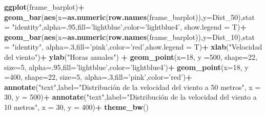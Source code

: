 \documentclass[]{article}
\newenvironment{Shaded}{\begin{snugshade}}{\end{snugshade}}
\newcommand{\KeywordTok}[1]{\textcolor[rgb]{0.13,0.29,0.53}{\textbf{#1}}}
\newcommand{\DataTypeTok}[1]{\textcolor[rgb]{0.13,0.29,0.53}{#1}}
\newcommand{\DecValTok}[1]{\textcolor[rgb]{0.00,0.00,0.81}{#1}}
\newcommand{\StringTok}[1]{\textcolor[rgb]{0.31,0.60,0.02}{#1}}
\newcommand{\OperatorTok}[1]{\textcolor[rgb]{0.81,0.36,0.00}{\textbf{#1}}}
\newcommand{\NormalTok}[1]{#1}
\begin{document}
\begin{Shaded}
\begin{Highlighting}[]
{{{\KeywordTok{ggplot}\NormalTok{(frame_barplot)}\OperatorTok{+}
\StringTok{  }\KeywordTok{geom_bar}\NormalTok{(}\KeywordTok{aes}\NormalTok{(}\DataTypeTok{x=}\KeywordTok{as.numeric}\NormalTok{(}\KeywordTok{row.names}\NormalTok{(frame_barplot)),}\DataTypeTok{y=}\NormalTok{Dist_}\DecValTok{50}\NormalTok{),}\DataTypeTok{stat =} \StringTok{"identity"}\NormalTok{,}\DataTypeTok{alpha=}\NormalTok{.}\DecValTok{95}\NormalTok{,}\DataTypeTok{fill=}\StringTok{'lightblue'}\NormalTok{,}\DataTypeTok{color=}\StringTok{'lightblue4'}\NormalTok{, }\DataTypeTok{show.legend =}\NormalTok{ T)}\OperatorTok{+}
\StringTok{  }\KeywordTok{geom_bar}\NormalTok{(}\KeywordTok{aes}\NormalTok{(}\DataTypeTok{x=}\KeywordTok{as.numeric}\NormalTok{(}\KeywordTok{row.names}\NormalTok{(frame_barplot)),}\DataTypeTok{y=}\NormalTok{Dist_}\DecValTok{10}\NormalTok{),}\DataTypeTok{stat =} \StringTok{"identity"}\NormalTok{, }\DataTypeTok{alpha=}\NormalTok{.}\DecValTok{3}\NormalTok{,}\DataTypeTok{fill=}\StringTok{'pink'}\NormalTok{,}\DataTypeTok{color=}\StringTok{'red'}\NormalTok{,}\DataTypeTok{show.legend =}\NormalTok{ T)}\OperatorTok{+}
\KeywordTok{xlab}\NormalTok{(}\StringTok{"Velocidad del viento"}\NormalTok{)}\OperatorTok{+}
\KeywordTok{ylab}\NormalTok{(}\StringTok{"Horas anuales"}\NormalTok{) }\OperatorTok{+}
\StringTok{ }\KeywordTok{geom_point}\NormalTok{(}\DataTypeTok{x=}\DecValTok{18}\NormalTok{, }\DataTypeTok{y =}\DecValTok{500}\NormalTok{, }\DataTypeTok{shape=}\DecValTok{22}\NormalTok{, }\DataTypeTok{size=}\DecValTok{5}\NormalTok{, }\DataTypeTok{alpha=}\NormalTok{.}\DecValTok{95}\NormalTok{,}\DataTypeTok{fill=}\StringTok{'lightblue'}\NormalTok{,}\DataTypeTok{color=}\StringTok{'lightblue4'}\NormalTok{)}\OperatorTok{+}
\KeywordTok{geom_point}\NormalTok{(}\DataTypeTok{x=}\DecValTok{18}\NormalTok{, }\DataTypeTok{y =}\DecValTok{400}\NormalTok{, }\DataTypeTok{shape=}\DecValTok{22}\NormalTok{, }\DataTypeTok{size=}\DecValTok{5}\NormalTok{, }\DataTypeTok{alpha=}\NormalTok{.}\DecValTok{3}\NormalTok{,}\DataTypeTok{fill=}\StringTok{'pink'}\NormalTok{,}\DataTypeTok{color=}\StringTok{'red'}\NormalTok{)}\OperatorTok{+}
\KeywordTok{annotate}\NormalTok{(}\StringTok{"text"}\NormalTok{,}\DataTypeTok{label=}\StringTok{"Distribución de la velocidad del viento a 50 metros"}\NormalTok{, }\DataTypeTok{x =} \DecValTok{30}\NormalTok{, }\DataTypeTok{y =} \DecValTok{500}\NormalTok{)}\OperatorTok{+}
\StringTok{  }\KeywordTok{annotate}\NormalTok{(}\StringTok{"text"}\NormalTok{,}\DataTypeTok{label=}\StringTok{"Distribución de la velocidad del viento a 10 metros"}\NormalTok{, }\DataTypeTok{x =} \DecValTok{30}\NormalTok{, }\DataTypeTok{y =} \DecValTok{400}\NormalTok{)}\OperatorTok{+}
\StringTok{  }\KeywordTok{theme_bw}\NormalTok{()}

}}}
\end{Highlighting}
\end{Shaded}
\end{document}
